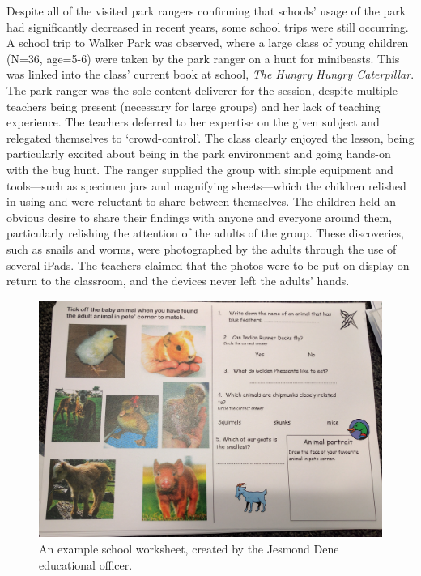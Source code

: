 Despite all of the visited park rangers confirming that schools’ usage of the park had significantly decreased in recent years, some school trips were still occurring. A school trip to Walker Park was observed, where a large class of young children (N=36, age=5-6) were taken by the park ranger on a hunt for minibeasts. This was linked into the class' current book at school, \textit{The Hungry Hungry Caterpillar}. The park ranger was the sole content deliverer for the session, despite multiple teachers being present (necessary for large groups) and her lack of teaching experience. The teachers deferred to her expertise on the given subject and relegated themselves to `crowd-control'. The class clearly enjoyed the lesson, being particularly excited about being in the park environment and going hands-on with the bug hunt. The ranger supplied the group with simple equipment and tools---such as specimen jars and magnifying sheets---which the children relished in using and were reluctant to share between themselves. The children held an obvious desire to share their findings with anyone and everyone around them, particularly relishing the attention of the adults of the group. These discoveries, such as snails and worms, were photographed by the adults through the use of several iPads. The teachers claimed that the photos were to be put on display on return to the classroom, and the devices never left the adults' hands.

\begin{figure}
  \centering
  \includegraphics[width=0.8\columnwidth]{images/chapter04/worksheet.jpg}
  \caption{An example school worksheet, created by the Jesmond Dene educational officer.}
  \label{fig:worksheet}
\end{figure}

